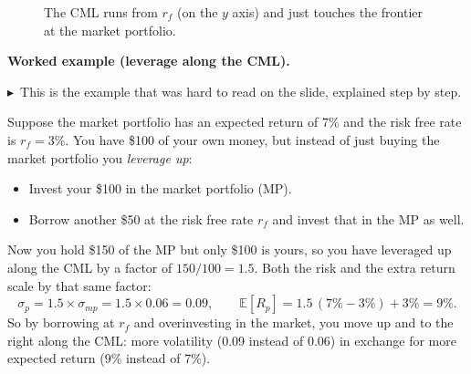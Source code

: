 \documentclass[11pt]{article}
\newcommand{\fillnote}[1]{\begin{noteboxenv}\small\textcolor{cNote}{$\blacktriangleright$}\ #1\end{noteboxenv}}
\begin{document}
\begin{figure}[h]
\centering
{}
\caption*{The CML runs from $r_f$ (on the $y$ axis) and just touches the frontier at the market portfolio.}
\end{figure}

\textbf{Worked example (leverage along the CML).}
\fillnote{This is the example that was hard to read on the slide, explained step
by step.}

Suppose the market portfolio has an expected return of 7\% and the risk free
rate is $r_f = 3\%$. You have \$100 of your own money, but instead of just buying
the market portfolio you \emph{leverage up}:
\begin{itemize}[nosep]
  \item Invest your \$100 in the market portfolio (MP).
  \item Borrow another \$50 at the risk free rate $r_f$ and invest that in the MP
        as well.
\end{itemize}
Now you hold \$150 of the MP but only \$100 is yours, so you have leveraged up
along the CML by a factor of $150/100 = 1.5$. Both the risk and the extra return
scale by that same factor:
\[
\sigma_p = 1.5 \times \sigma_{mp} = 1.5 \times 0.06 = 0.09,
\qquad
\mathbb{E}[R_p] = 1.5\,(7\% - 3\%) + 3\% = 9\%.
\]
So by borrowing at $r_f$ and overinvesting in the market, you move up and to the
right along the CML: more volatility (0.09 instead of 0.06) in exchange for more
expected return (9\% instead of 7\%).
\end{document}
